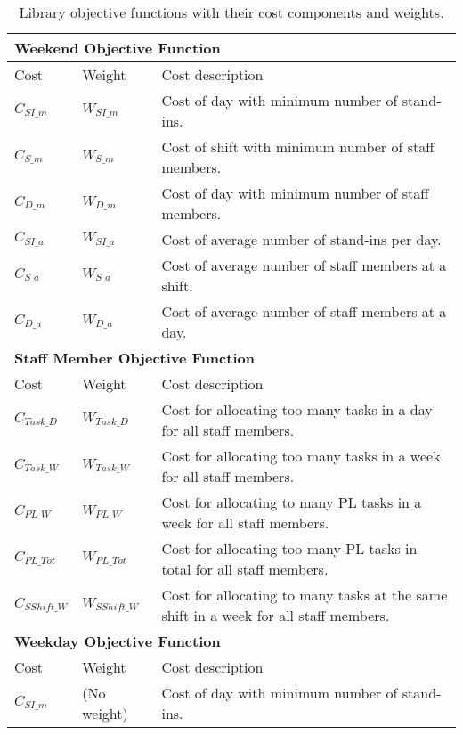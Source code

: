 \begin{table}[!h]
\centering
\caption{Library objective functions with their cost components and weights.}
\label{tab:lib_costs}
\begin{tabular}{|l|l|p{7cm}|}
\hline
\multicolumn{3}{|l|}{\cellcolor{gray!90} \textbf{Weekend Objective Function}} \\
\hline 
\rowcolor{Gray} Cost & Weight & Cost description \\ \hline
$C_{SI\_m}$ & $W_{SI\_m}$ & Cost of day with minimum number of stand-ins. \\ \hline
$C_{S\_m}$ & $W_{S\_m}$ & Cost of shift with minimum number of staff members. \\ \hline
$C_{D\_m}$ & $W_{D\_m}$ & Cost of day with minimum number of staff members. \\ \hline
$C_{SI\_a}$ & $W_{SI\_a}$ & Cost of average number of stand-ins per day. \\ \hline
$C_{S\_a}$ & $W_{S\_a}$ & Cost of average number of staff members at a shift. \\ \hline
$C_{D\_a}$ & $W_{D\_a}$ & Cost of average number of staff members at a day. \\ \hline
\hline
\multicolumn{3}{|l|}{\cellcolor{gray!90} \textbf{Staff Member Objective Function}} \\
\hline
\rowcolor{Gray} Cost & Weight & Cost description \\ \hline
$C_{Task\_D}$ & $W_{Task\_D}$ & Cost for allocating too many tasks in a day for all staff members. \\ \hline
$C_{Task\_W}$ & $W_{Task\_W}$ & Cost for allocating too many tasks in a week for all staff members. \\ \hline
$C_{PL\_W}$ & $W_{PL\_W}$ & Cost for allocating to many PL tasks in a week for all staff members. \\ \hline
$C_{PL\_Tot}$ & $W_{PL\_Tot}$ & Cost for allocating too many PL tasks in total for all staff members. \\ \hline
$C_{SShift\_W}$ & $W_{SShift\_W}$ & Cost for allocating to many tasks at the same shift in a week for all staff members. \\ \hline
\hline
 \multicolumn{3}{|l|}{\cellcolor{gray!90} \textbf{Weekday Objective Function}} \\
\hline
\rowcolor{Gray} Cost & Weight & Cost description \\ \hline
$C_{SI\_m}$ & (No weight) & Cost of day with minimum number of stand-ins. \\ \hline
\end{tabular}
\end{table}


